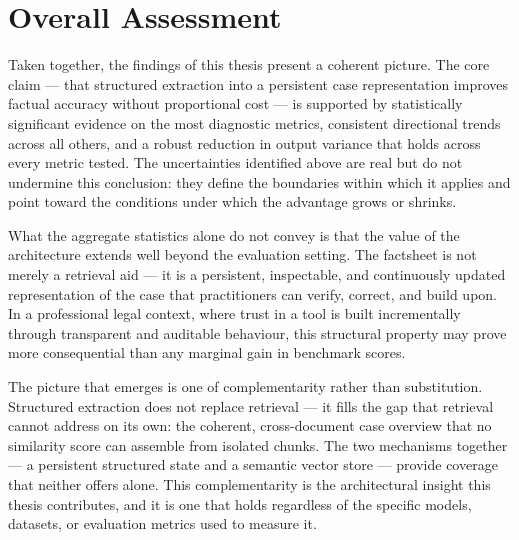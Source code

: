 \section{Overall Assessment}

Taken together, the findings of this thesis present a coherent picture. The core claim --- that structured extraction into a persistent case representation improves factual accuracy without proportional cost --- is supported by statistically significant evidence on the most diagnostic metrics, consistent directional trends across all others, and a robust reduction in output variance that holds across every metric tested. The uncertainties identified above are real but do not undermine this conclusion: they define the boundaries within which it applies and point toward the conditions under which the advantage grows or shrinks.

What the aggregate statistics alone do not convey is that the value of the architecture extends well beyond the evaluation setting. The factsheet is not merely a retrieval aid --- it is a persistent, inspectable, and continuously updated representation of the case that practitioners can verify, correct, and build upon. In a professional legal context, where trust in a tool is built incrementally through transparent and auditable behaviour, this structural property may prove more consequential than any marginal gain in benchmark scores.

The picture that emerges is one of complementarity rather than substitution. Structured extraction does not replace retrieval --- it fills the gap that retrieval cannot address on its own: the coherent, cross-document case overview that no similarity score can assemble from isolated chunks. The two mechanisms together --- a persistent structured state and a semantic vector store --- provide coverage that neither offers alone. This complementarity is the architectural insight this thesis contributes, and it is one that holds regardless of the specific models, datasets, or evaluation metrics used to measure it.